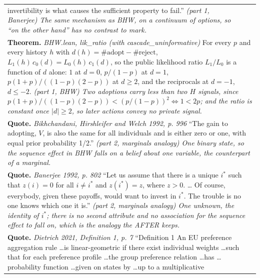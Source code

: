 \documentclass[10pt]{article}
\theoremstyle{definition}
\newlength{\fullw}\setlength{\fullw}{25.9cm}
\begin{document}
{\begin{longtable}{|p{0.9cm}|p{12.2cm}|p{12.2cm}|}
{invertibility is what causes the sufficient property to fail.'' \newline \textit{(part 1, Banerjee) The same mechanism as BHW, on a continuum of
options, so ``on the other hand'' has no contrast to mark.}} \\
\multicolumn{3}{|p{\fullw}|}{\textbf{Theorem.} \textit{BHW.lean, lik\_ratio (with cascade\_uninformative)} \newline For every $p$ and every history $h$ with
$d(h) = \#\mathrm{adopt} - \#\mathrm{reject}$,
$L_1(h)\,c_0(d) = L_0(h)\,c_1(d)$, so the public likelihood ratio
$L_1/L_0$ is a function of $d$ alone: $1$ at $d=0$, $p/(1-p)$ at $d=1$,
$p(1+p)/((1-p)(2-p))$ at $d\ge 2$, and the reciprocals at $d=-1$, $d\le-2$. \newline \textit{(part 1, BHW) Two adoptions carry less than two $H$ signals,
since $p(1+p)/((1-p)(2-p)) < (p/(1-p))^2 \iff 1 < 2p$; and the ratio is
constant once $|d|\ge 2$, so later actions convey no private signal.}} \\
\multicolumn{3}{|p{\fullw}|}{\textbf{Quote.} \textit{Bikhchandani, Hirshleifer and Welch 1992, p. 996} \newline ``The gain to adopting, $V$, is also the same for all
individuals and is either zero or one, with equal prior probability 1/2.'' \newline \textit{(part 2, marginals analogy) One binary state, so the sequence
effect in BHW falls on a belief about one variable, the counterpart of a
marginal.}} \\
\multicolumn{3}{|p{\fullw}|}{\textbf{Quote.} \textit{Banerjee 1992, p. 802} \newline ``Let us assume that there is a unique $i^{*}$ such that
$z(i) = 0$ for all $i \neq i^{*}$ and $z(i^{*}) = z$, where $z > 0$. \ldots
Of course, everybody, given these payoffs, would want to invest in $i^{*}$.
The trouble is no one knows which one it is.'' \newline \textit{(part 2, marginals analogy) One unknown, the identity of
$i^{*}$; there is no second attribute and no association for the sequence
effect to fall on, which is the analogy the AFTER keeps.}} \\
\multicolumn{3}{|p{\fullw}|}{\textbf{Quote.} \textit{Dietrich 2021, Definition 1, p. 7} \newline ``Definition 1 An EU preference aggregation rule \ldots is
linear-geometric if there exist individual weights \ldots such that for each
preference profile \ldots the group preference relation \ldots has \ldots
probability function \ldots given on states by \ldots up to a multiplicative
}
\end{longtable}}
\end{document}
